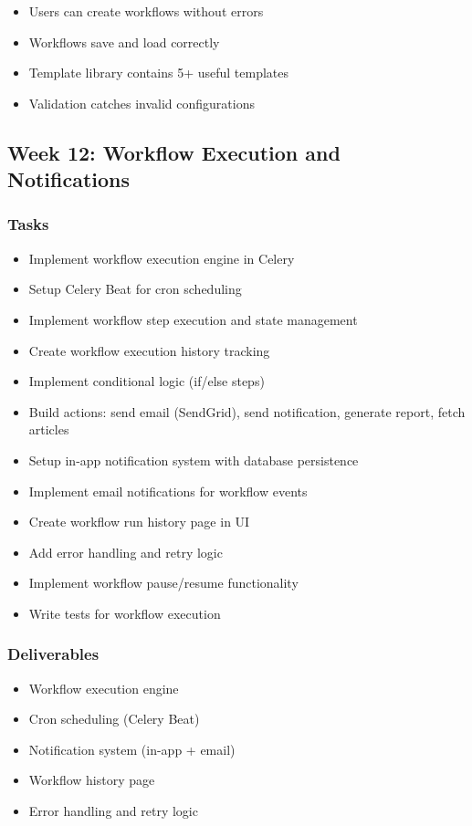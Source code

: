 \documentclass[12pt,oneside]{report}
\begin{document}
\begin{itemize}
    \item Users can create workflows without errors
    \item Workflows save and load correctly
    \item Template library contains 5+ useful templates
    \item Validation catches invalid configurations
\end{itemize}

\subsection{Week 12: Workflow Execution and Notifications}

\subsubsection{Tasks}

\begin{itemize}
    \item Implement workflow execution engine in Celery
    \item Setup Celery Beat for cron scheduling
    \item Implement workflow step execution and state management
    \item Create workflow execution history tracking
    \item Implement conditional logic (if/else steps)
    \item Build actions: send email (SendGrid), send notification, generate report, fetch articles
    \item Setup in-app notification system with database persistence
    \item Implement email notifications for workflow events
    \item Create workflow run history page in UI
    \item Add error handling and retry logic
    \item Implement workflow pause/resume functionality
    \item Write tests for workflow execution
\end{itemize}

\subsubsection{Deliverables}

\begin{itemize}
    \item Workflow execution engine
    \item Cron scheduling (Celery Beat)
    \item Notification system (in-app + email)
    \item Workflow history page
    \item Error handling and retry logic
\end{itemize}
\end{document}
